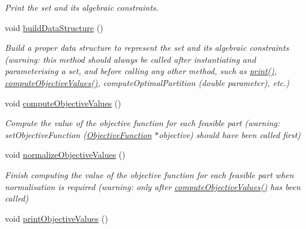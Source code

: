 \begin{DoxyCompactItemize}
\begin{DoxyCompactList}\small\item\em Print the set and its algebraic constraints. \end{DoxyCompactList}\item 
\hypertarget{classHyperStructure_a6ad130df72d4ea8133c269ec898d51fa}{void \hyperlink{classHyperStructure_a6ad130df72d4ea8133c269ec898d51fa}{build\-Data\-Structure} ()}\label{classHyperStructure_a6ad130df72d4ea8133c269ec898d51fa}

\begin{DoxyCompactList}\small\item\em Build a proper data structure to represent the set and its algebraic constraints (warning\-: this method should always be called after instantiating and parameterising a set, and before calling any other method, such as \hyperlink{classHyperStructure_ae2c9f70f3b85cde571fdcf06b7ae08ea}{print()}, \hyperlink{classHyperStructure_a7548fc87c5e85830226ecdbadb5d4380}{compute\-Objective\-Values()}, compute\-Optimal\-Partition (double parameter), etc.) \end{DoxyCompactList}\item 
\hypertarget{classHyperStructure_a7548fc87c5e85830226ecdbadb5d4380}{void \hyperlink{classHyperStructure_a7548fc87c5e85830226ecdbadb5d4380}{compute\-Objective\-Values} ()}\label{classHyperStructure_a7548fc87c5e85830226ecdbadb5d4380}

\begin{DoxyCompactList}\small\item\em Compute the value of the objective function for each feasible part (warning\-: set\-Objective\-Function (\hyperlink{classObjectiveFunction}{Objective\-Function} $\ast$objective) should have been called first) \end{DoxyCompactList}\item 
\hypertarget{classHyperStructure_aafb180a73ba1ce8986a2c4a8dbac85cb}{void \hyperlink{classHyperStructure_aafb180a73ba1ce8986a2c4a8dbac85cb}{normalize\-Objective\-Values} ()}\label{classHyperStructure_aafb180a73ba1ce8986a2c4a8dbac85cb}

\begin{DoxyCompactList}\small\item\em Finish computing the value of the objective function for each feasible part when normalisation is required (warning\-: only after \hyperlink{classHyperStructure_a7548fc87c5e85830226ecdbadb5d4380}{compute\-Objective\-Values()} has been called) \end{DoxyCompactList}\item 
\hypertarget{classHyperStructure_ab408a372347d5c6683637a30900e5a6c}{void \hyperlink{classHyperStructure_ab408a372347d5c6683637a30900e5a6c}{print\-Objective\-Values} ()}\label{classHyperStructure_ab408a372347d5c6683637a30900e5a6c}


\end{DoxyCompactItemize}
